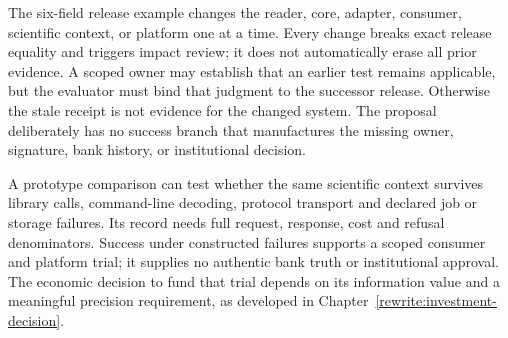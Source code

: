 The six-field release example changes the reader, core, adapter, consumer,
scientific context, or platform one at a time. Every change breaks exact
release equality and triggers impact review; it does not automatically erase
all prior evidence. A scoped owner may establish that an earlier test remains
applicable, but the evaluator must bind that judgment to the successor
release. Otherwise the stale receipt is not evidence for the changed system.
The proposal deliberately has no success branch that manufactures the missing
owner, signature, bank history, or institutional decision.
\citep{exec17_continuity_reference,exec17_continuity_contract}

A prototype comparison can test whether the same scientific context survives
library calls, command-line decoding, protocol transport and declared job or
storage failures. Its record needs full request, response, cost and refusal
denominators. Success under constructed failures supports a scoped consumer
and platform trial; it supplies no authentic bank truth or institutional
approval. The economic decision to fund that trial depends on its information
value and a meaningful precision requirement, as developed in
Chapter~\ref{rewrite:investment-decision}.
\label{exec17:integration-continuity-end}
